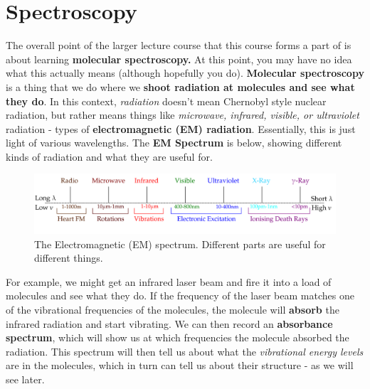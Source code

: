 \documentclass{memoir}[11pt,oneside,a4paper,openany]
\begin{document}
\section{Spectroscopy}
The overall point of the larger lecture course that this course forms a part of is about learning \textbf{molecular spectroscopy.} At this point, you may have no idea what this actually means (although hopefully you do). \textbf{Molecular spectroscopy} is a thing that we do where we \textbf{shoot radiation at molecules and see what they do}. In this context, \emph{radiation} doesn't mean Chernobyl style nuclear radiation, but rather means things like \emph{microwave, infrared, visible, or ultraviolet} radiation - types of \textbf{electromagnetic (EM) radiation}. Essentially, this is just light of various wavelengths. The \textbf{EM Spectrum} is below, showing different kinds of radiation and what they are useful for. 

\begin{figure}[h]
\centering
	\includegraphics[width=\textwidth]{EM_spectrum}
	\caption{The Electromagnetic (EM) spectrum. Different parts are useful for different things.}
\end{figure}
For example, we might get an infrared laser beam and fire it into a load of molecules and see what they do. If the frequency of the laser beam matches one of the vibrational frequencies of the molecules, the molecule will \textbf{absorb} the infrared radiation and start vibrating. We can then record an \textbf{absorbance spectrum}, which will show us at which frequencies the molecule absorbed the radiation. This spectrum will then tell us about what the \emph{vibrational energy levels} are in the molecules, which in turn can tell us about their structure - as we will see later.
\end{document}
